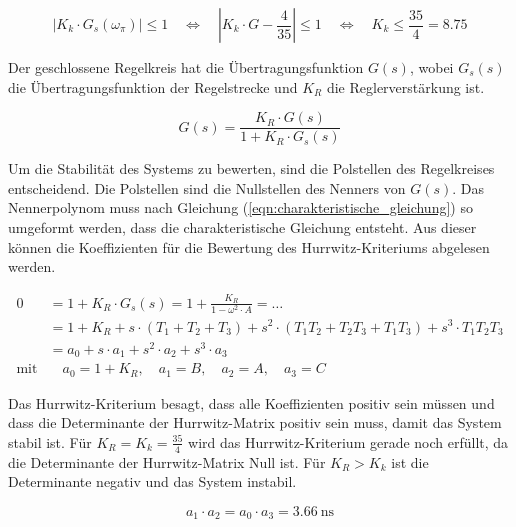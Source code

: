 \begin{equation}
    |K_k\cdot G_s(\omega_{\pi})| \leq 1
    \quad \Leftrightarrow \quad
    |K_k\cdot G-\frac{4}{35}| \leq 1
    \quad \Leftrightarrow \quad
    K_k \leq \frac{35}{4} = 8.75
    \label{eqn:kk}
\end{equation}

Der geschlossene Regelkreis hat die Übertragungsfunktion $G(s)$, wobei $G_s(s)$ die Übertragungsfunktion der Regelstrecke und $K_R$ die Reglerverstärkung ist.

\begin{equation}
    G(s) =\frac{K_R \cdot G(s)}{1+K_R\cdot G_s(s)}
    \label{eqn:closed_tf}
\end{equation}

Um die Stabilität des Systems zu bewerten, sind die Polstellen des Regelkreises entscheidend. Die Polstellen sind die Nullstellen des Nenners von $G(s)$. 
Das Nennerpolynom muss nach Gleichung (\ref{eqn:charakteristische_gleichung}) so umgeformt werden, dass die charakteristische Gleichung entsteht. Aus dieser können die Koeffizienten für die Bewertung des Hurrwitz-Kriteriums abgelesen werden.

\begin{equation}
    \begin{split}
        0          & =1+K_R\cdot G_s(s)=1+ \frac{K_R}{1-\omega^2 \cdot A}= \dots                                \\
                   & = 1+ K_R+ s\cdot (T_1+T_2 + T_3) + s^2\cdot (T_1T_2+T_2T_3+T_1T_3) + s^3 \cdot T_1 T_2 T_3 \\
                   & =a_0 + s\cdot a_1 + s^2 \cdot a_2 + s^3 \cdot a_3                                          \\
        \text{mit} & \quad a_0 = 1+K_R, \quad a_1=B, \quad a_2=A, \quad a_3=C
    \end{split}
    \label{eqn:charakteristische_gleichung}
\end{equation}

Das Hurrwitz-Kriterium besagt, dass alle Koeffizienten positiv sein müssen und dass die Determinante der Hurrwitz-Matrix positiv sein muss, damit das System stabil ist. 
Für $K_R=K_k=\frac{35}{4}$ wird das Hurrwitz-Kriterium gerade noch erfüllt, da die Determinante der Hurrwitz-Matrix Null ist. Für $K_R>K_k$ ist die Determinante negativ und das System instabil.

\begin{equation}
    a_1\cdot a_2 = a_0\cdot a_3 = \SI{3.66}{\nano\second}
\end{equation}